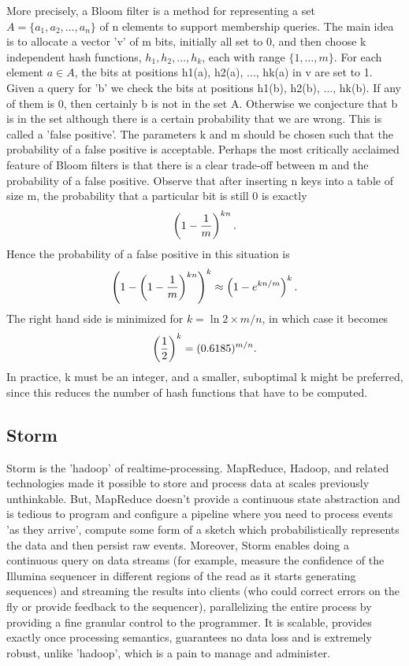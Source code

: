 \documentclass[11pt]{article}
\begin{document}
More precisely, a Bloom filter is a method for representing a set $A = \{a_1, a_2, \ldots, a_n\}$ of n elements to support membership queries. The main idea is to allocate a vector 'v' of m bits, initially all set to 0, and then choose k independent hash functions, $h_1, h_2, \ldots, h_k$, each with range $\{1,\ldots,m\}$. For each element $a \in A$, the bits at positions h1(a), h2(a), ..., hk(a) in v are set to 1. Given a query for 'b' we check the bits at positions h1(b), h2(b), ..., hk(b). If any of them is 0, then certainly b is not in the set A. Otherwise we conjecture that b is in the set although there is a certain probability that we are wrong. This is called a 'false positive'. The parameters k and m should be chosen such that the probability of a false positive is acceptable. Perhaps the most critically acclaimed  feature of Bloom filters is that there is a clear trade-off between m and the probability of a false positive. Observe that after inserting n keys into a table of size m, the probability that a particular bit is still 0 is exactly
\begin{displaymath} \left(1 - {1\over m}\right)^{k n}.\end{displaymath}
Hence the probability of a false positive in this situation is
\begin{displaymath} \left( 1 - \left(1 - {1\over m}\right)^{k n} \right)^k \approx \left(1 - e ^ { k n /m} \right)^k .\end{displaymath}
The right hand side is minimized for $k = \ln 2 \times m / n$, in which case it becomes
\begin{displaymath} \left({1\over2} \right) ^k = (0.6185)^{m/n}.\end{displaymath}
In practice, k must be an integer, and a smaller, suboptimal k might be preferred, since this reduces the number of hash functions that have to be computed.

\subsection{Storm}
Storm \cite{storm} is the 'hadoop' of realtime-processing. MapReduce, Hadoop, and related technologies made it possible to store and process data at scales previously unthinkable. But, MapReduce doesn't provide a continuous state abstraction and is tedious to program and configure a pipeline where you need to process events 'as they arrive', compute some form of a sketch \cite{bloom} which probabilistically represents the data and then persist raw events. Moreover, Storm enables doing a continuous query on data streams (for example, measure the confidence of the Illumina sequencer in different regions of the read as it starts generating sequences) and streaming the results into clients (who could correct errors on the fly or provide feedback to the sequencer), parallelizing the entire process by providing a fine granular control to the programmer. It is scalable, provides exactly once processing semantics, guarantees no data loss and is extremely robust, unlike 'hadoop', which is a pain to manage and administer.
\end{document}
